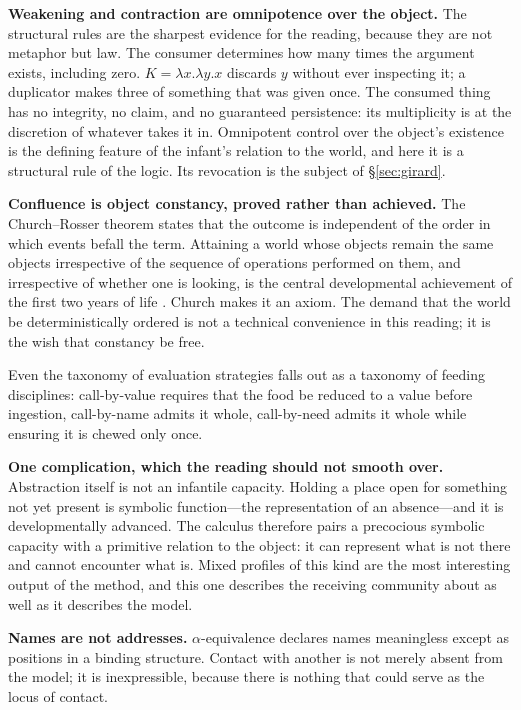 \documentclass[11pt,a4paper]{article}
\begin{document}
\textbf{Weakening and contraction are omnipotence over the object.} The
structural rules are the sharpest evidence for the reading, because they are not
metaphor but law. The consumer determines how many times the argument exists,
including zero. $K = \lambda x.\lambda y.x$ discards $y$ without ever inspecting
it; a duplicator makes three of something that was given once. The consumed thing
has no integrity, no claim, and no guaranteed persistence: its multiplicity is at
the discretion of whatever takes it in. Omnipotent control over the object's
existence is the defining feature of the infant's relation to the world, and here
it is a structural rule of the logic. Its revocation is the subject of
\S\ref{sec:girard}.

\textbf{Confluence is object constancy, proved rather than achieved.} The
Church--Rosser theorem states that the outcome is independent of the order in
which events befall the term. Attaining a world whose objects remain the same
objects irrespective of the sequence of operations performed on them, and
irrespective of whether one is looking, is the central developmental achievement
of the first two years of life \cite{piaget1954}. Church makes it an axiom. The
demand that the world be deterministically ordered is not a technical convenience
in this reading; it is the wish that constancy be free.

Even the taxonomy of evaluation strategies falls out as a taxonomy of feeding
disciplines: call-by-value requires that the food be reduced to a value before
ingestion, call-by-name admits it whole, call-by-need admits it whole while
ensuring it is chewed only once.

\textbf{One complication, which the reading should not smooth over.} Abstraction
itself is not an infantile capacity. Holding a place open for something not yet
present is symbolic function---the representation of an absence---and it is
developmentally advanced. The calculus therefore pairs a precocious symbolic
capacity with a primitive relation to the object: it can represent what is not
there and cannot encounter what is. Mixed profiles of this kind are the most
interesting output of the method, and this one describes the receiving community
about as well as it describes the model.

\textbf{Names are not addresses.} $\alpha$-equivalence declares names meaningless
except as positions in a binding structure. Contact with another is not merely
absent from the model; it is inexpressible, because there is nothing that could
serve as the locus of contact.
\end{document}
